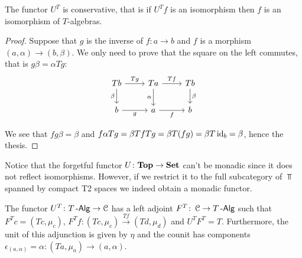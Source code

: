 \documentclass[a4paper,11pt,oneside,openany]{scrbook}
\begin{document}
\begin{lemma}
	The functor $U^T$ is conservative, that is if $U^Tf$ is an isomorphism then $f$ is an isomorphism of $T$-algebras.
\end{lemma}
\begin{proof}
	Suppose that $g$ is the inverse of $f\colon a\rightarrow b$ and $f$ is a morphism $(a,\alpha)\rightarrow (b,\beta)$. We only need to prove that the square on the left commutes, that is $g\beta=\alpha Tg$:
	\[
		\begin{tikzcd}
			Tb\arrow["\beta"']{d}\arrow["Tg"]{r}
			& Ta\arrow["\alpha"']{d}\arrow["Tf"]{r}
			& Tb\arrow["\beta"]{d} \\
			b\arrow["g"']{r}
			& a\arrow["f"']{r}
			& b
		\end{tikzcd}
	\]

	We see that $fg\beta=\beta$ and $f\alpha Tg=\beta Tf Tg=\beta T(fg)=\beta T\operatorname{id}_b=\beta$, hence the thesis.
\end{proof}
\begin{rmk}
	Notice that the forgetful functor $U\colon{\normalfont\textbf{Top}}\to{\normalfont\textbf{Set}}$ can't be monadic
	since it does not reflect isomorphisms. However, if we restrict it to
	the full subcategory of $\Top$ spanned by compact T2 spaces we indeed
	obtain a monadic functor.
\end{rmk}
\begin{prop}
	The functor $U^T\colon T\operatorname{-\mathsf{Alg}}\rightarrow\operatorname{\mathcal{C}}$ has a left adjoint $F^T\colon\operatorname{\mathcal{C}}\rightarrow T\operatorname{-\mathsf{Alg}}$ such that $F^Tc=(Tc,\mu_{c})$, $F^Tf\colon(Tc,\mu_{c})\xrightarrow{Tf} (Td,\mu_{d})$ and $U^TF^T=T$. Furthermore, the unit of this adjunction is given by $\eta$ and the counit has components $\epsilon_{(a,\alpha)}=\alpha\colon(Ta,\mu_a)\to(a,\alpha)$.
\end{prop}
\end{document}

